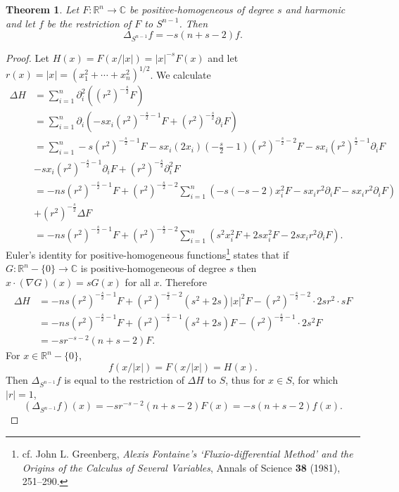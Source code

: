 \documentclass{article}
\newtheorem{theorem}{Theorem}
\theoremstyle{definition}
\begin{document}
\begin{theorem}
Let $F:\mathbb{R}^n \to \mathbb{C}$ be positive-homogeneous of degree $s$ and harmonic and let $f$ be the restriction of $F$ to $S^{n-1}$. Then
\[
\Delta_{S^{n-1}} f = -s(n+s-2)f.
\]
\label{Seigenvalue}
\end{theorem}
\begin{proof}
Let $H(x)=F(x/|x|)=|x|^{-s}F(x)$ and let $r(x)=|x|=(x_1^2+\cdots+x_n^2)^{1/2}$.
We calculate
\begin{align*}
\Delta H&=\sum_{i=1}^n \partial_i^2 ((r^2)^{-\frac{s}{2}} F)\\
&=\sum_{i=1}^n \partial_i\left(-s x_i (r^2)^{-\frac{s}{2}-1} F + (r^2)^{-\frac{s}{2}} \partial_i F\right)\\
&=\sum_{i=1}^n -s(r^2)^{-\frac{s}{2}-1} F  -  sx_i(2x_i)\left(-\frac{s}{2}-1\right) (r^2)^{-\frac{s}{2}-2} F
-sx_i(r^2)^{\frac{s}{2}-1} \partial_i F\\
&-sx_i (r^2)^{-\frac{s}{2}-1}\partial_i F
+(r^2)^{-\frac{s}{2}} \partial_i^2 F\\
&=-ns(r^2)^{-\frac{s}{2}-1} F +(r^2)^{-\frac{s}{2}-2} \sum_{i=1}^n \left( -s(-s-2)x_i^2F- sx_ir^2 \partial_i F
-sx_i r^2 \partial_i F\right)\\
&+(r^2)^{-\frac{s}{2}} \Delta F\\
&=-ns(r^2)^{-\frac{s}{2}-1} F+(r^2)^{-\frac{s}{2}-2} \sum_{i=1}^n (s^2 x_i^2 F+2sx_i^2 F - 2sx_ir^2 \partial_i F).
\end{align*}
Euler's identity for positive-homogeneous functions\footnote{cf. John L. Greenberg,
{\em Alexis Fontaine's `Fluxio-differential
Method' and the Origins of the Calculus
of Several Variables}, Annals of Science \textbf{38} (1981), 251--290.}
states that if  $G:\mathbb{R}^n - \{0\} \to \mathbb{C}$ is positive-homogeneous
of degree $s$ then $x \cdot (\nabla G)(x)=s G(x)$ for all $x$. Therefore
\begin{align*}
\Delta H&=-ns(r^2)^{-\frac{s}{2}-1} F + (r^2)^{-\frac{s}{2}-2} (s^2+2s)|x|^2 F 
- (r^2)^{-\frac{s}{2}-2} \cdot 2sr^2 \cdot s F\\
&=-ns(r^2)^{-\frac{s}{2}-1} F  + (r^2)^{-\frac{s}{2}-1} (s^2+2s) F - (r^2)^{-\frac{s}{2}-1} \cdot 2s^2F\\
&=-sr^{-s-2}(n+s-2)F.
\end{align*}
For $x \in \mathbb{R}^n - \{0\}$,
\[
f(x/|x|) = F(x/|x|) = H(x).
\]
Then $\Delta_{S^{n-1}} f$ is equal to the restriction of $\Delta H$ to $S$, thus for $x \in S$, for which $|r|=1$,
\[
(\Delta_{S^{n-1}} f)(x) = -sr^{-s-2}(n+s-2)F(x) = 
-s(n+s-2)f(x).
\]
\end{proof}
\end{document}
